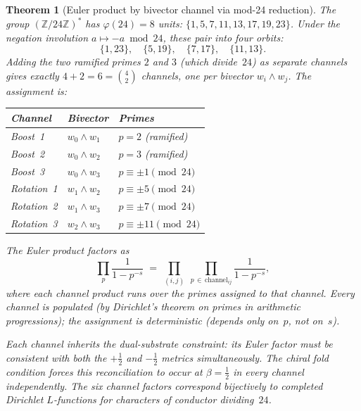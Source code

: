 \documentclass[11pt,a4paper]{article}
\theoremstyle{plain}
\newtheorem{theorem}{Theorem}[section]
\theoremstyle{definition}
\theoremstyle{remark}
\numberwithin{equation}{section}
\begin{document}
\begin{theorem}[Euler product by bivector channel via mod-24 reduction]
\label{thm:euler-bivector-channels}
The group \((\mathbb{Z}/24\mathbb{Z})^*\) has \(\varphi(24)=8\) units:
\(\{1,5,7,11,13,17,19,23\}\).  Under the negation involution
\(a\mapsto -a\bmod 24\), these pair into four orbits:
\[
  \{1,23\},\quad \{5,19\},\quad \{7,17\},\quad \{11,13\}.
\]
Adding the two ramified primes \(2\) and \(3\) (which divide~\(24\))
as separate channels gives exactly \(4+2=6=\binom{4}{2}\) channels,
one per bivector \(w_i\wedge w_j\).  The assignment is:
\begin{center}
\renewcommand{\arraystretch}{1.2}
\begin{tabular}{lll}
\toprule
\textbf{Channel} & \textbf{Bivector} & \textbf{Primes} \\
\midrule
Boost~1 & \(w_0\wedge w_1\) & \(p=2\) (ramified) \\
Boost~2 & \(w_0\wedge w_2\) & \(p=3\) (ramified) \\
Boost~3 & \(w_0\wedge w_3\) & \(p\equiv\pm1\pmod{24}\) \\
Rotation~1 & \(w_1\wedge w_2\) & \(p\equiv\pm5\pmod{24}\) \\
Rotation~2 & \(w_1\wedge w_3\) & \(p\equiv\pm7\pmod{24}\) \\
Rotation~3 & \(w_2\wedge w_3\) & \(p\equiv\pm11\pmod{24}\) \\
\bottomrule
\end{tabular}
\end{center}
The Euler product factors as
\[
  \prod_p \frac{1}{1-p^{-s}}
  \;=\; \prod_{(i,j)}\;\prod_{p\,\in\,\text{channel}_{ij}}
  \frac{1}{1-p^{-s}},
\]
where each channel product runs over the primes assigned to that
channel.  Every channel is populated (by Dirichlet's theorem on primes
in arithmetic progressions); the assignment is deterministic (depends
only on~\(p\), not on~\(s\)).

Each channel inherits the dual-substrate constraint: its Euler factor
must be consistent with both the \(+\tfrac12\) and \(-\tfrac12\) metrics
simultaneously.  The chiral fold condition forces this reconciliation
to occur at \(\beta=\tfrac12\) in every channel independently.  The
six channel factors correspond bijectively to completed Dirichlet
\(L\)-functions for characters of conductor dividing~\(24\).
\end{theorem}
\end{document}
